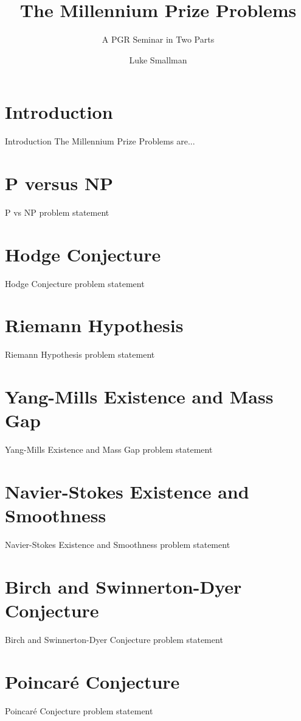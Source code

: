 \documentclass{beamer}
\title{The Millennium Prize Problems}
\subtitle{A PGR Seminar in Two Parts}
\date{}
\author{Luke Smallman}
\institute{Cardiff University} \titlegraphic{\hfill\texttt{[image: logo]}}
\newcommand{\Poincare}{Poincar\'{e}}
\begin{document}
  \maketitle
  \section{Introduction}
  \begin{frame}{Introduction}
    The Millennium Prize Problems are...
  \end{frame}

  \section{P versus NP}
  \begin{frame}{P vs NP}
      problem statement
  \end{frame}

  \section{Hodge Conjecture}
  \begin{frame}{Hodge Conjecture}
      problem statement
  \end{frame}

  \section{Riemann Hypothesis}
  \begin{frame}{Riemann Hypothesis}
      problem statement
  \end{frame}

  \section{Yang-Mills Existence and Mass Gap}
  \begin{frame}{Yang-Mills Existence and Mass Gap}
      problem statement
  \end{frame}

  \section{Navier-Stokes Existence and Smoothness}
  \begin{frame}{Navier-Stokes Existence and Smoothness}
      problem statement
  \end{frame}

  \section{Birch and Swinnerton-Dyer Conjecture}
  \begin{frame}{Birch and Swinnerton-Dyer Conjecture}
      problem statement
  \end{frame}

  \section{\Poincare{} Conjecture}
  \begin{frame}{\Poincare{} Conjecture}
      problem statement
  \end{frame}
\end{document}
